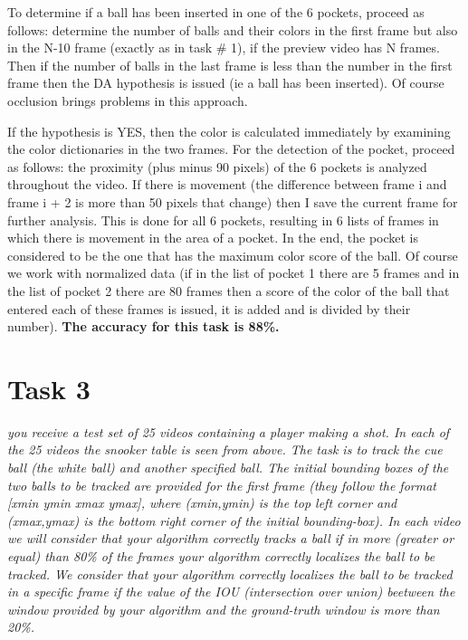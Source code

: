 \documentclass[12pt]{article}
\begin{document}
To determine if a ball has been inserted in one of the 6 pockets, proceed as follows: determine the 
number of balls and their colors in the first frame but also in the N-10 frame (exactly as in task 
\# 1), if the preview video has N frames. Then if the number of balls in the last frame is less than 
the number in the first frame then the DA hypothesis is issued (ie a ball has been inserted). Of 
course occlusion brings problems in this approach. \par

If the hypothesis is YES, then the color is calculated immediately by examining the color dictionaries 
in the two frames. For the detection of the pocket, proceed as follows: the proximity (plus minus 90 
pixels) of the 6 pockets is analyzed throughout the video. If there is movement (the difference 
between frame i and frame i + 2 is more than 50 pixels that change) then I save the current frame 
for further analysis. This is done for all 6 pockets, resulting in 6 lists of frames in which there 
is movement in the area of ​​a pocket. In the end, the pocket is considered to be the one that has 
the maximum color score of the ball. Of course we work with normalized data (if in the list of pocket 
1 there are 5 frames and in the list of pocket 2 there are 80 frames then a score of the color of the 
ball that entered each of these frames is issued, it is added and is divided by their number). 
\textbf{The accuracy for this task is 88\%.} \par

\section*{Task 3}

\emph{you receive a test set of 25 videos containing a player making a shot. In
each of the 25 videos the snooker table is seen from above. The task is to track the
cue ball (the white ball) and another specified ball. The initial bounding boxes of the
two balls to be tracked are provided for the first frame (they follow the format [xmin
ymin xmax ymax], where (xmin,ymin) is the top left corner and (xmax,ymax) is the
bottom right corner of the initial bounding-box).
In each video we will consider that your algorithm correctly tracks a ball if in
more (greater or equal) than 80\% of the frames your algorithm correctly localizes the
ball to be tracked. We consider that your algorithm correctly localizes the ball to be
tracked in a specific frame if the value of the IOU (intersection over union) beetween
the window provided by your algorithm and the ground-truth window is more than 20\%. }
\end{document}
